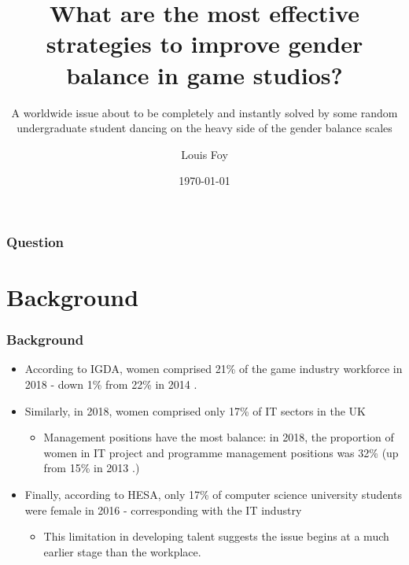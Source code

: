 \documentclass{beamer}
\title{What are the most effective strategies to improve gender balance in game studios?}
\subtitle{A worldwide issue about to be completely and instantly solved by some random undergraduate student dancing on the heavy side of the gender balance scales}
\author{Louis Foy}
\institute{Falmouth University}
\date{\today}
\begin{document}
\begin{frame}
	\titlepage
\end{frame}

\begin{frame}
	\frametitle{Question}
	\tableofcontents
\end{frame}

\section{Background}
\begin{frame}
	\frametitle{Background}
	\begin{itemize}
	    \item According to IGDA, women comprised 21\% of the game industry workforce in 2018 \cite{igda_satisfaction_2017} - down 1\% from 22\% in 2014 \cite{igda_satisfaction_2014}.
	    \item Similarly, in 2018, women comprised only 17\% of IT sectors in the UK \cite{uk_employees} %
	    \begin{itemize}
	        \item Management positions have the most balance: in 2018, the proportion of women in IT project and programme management positions was 32\% \cite{uk_employees_2018} (up from 15\% in 2013 \cite{uk_employees_2013}.)
	    \end{itemize}
	    \item Finally, according to HESA, only 17\% of computer science university students were female in 2016 \cite{hesa_2016} - corresponding with the IT industry
	    \begin{itemize}
	        \item This limitation in developing talent suggests the issue begins at a much earlier stage than the workplace.
	    \end{itemize}
	\end{itemize}
\end{frame}
\end{document}
